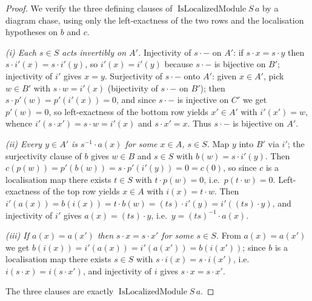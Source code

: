 \begin{proof}
  \leanok

We verify the three defining clauses of \(\operatorname{IsLocalizedModule} S\, a\) by a diagram chase,
  using only the left-exactness of the two rows and the localisation hypotheses on \(b\) and \(c\).

  \emph{(i) Each \(s \in S\) acts invertibly on \(A'\).} Injectivity of \(s \cdot -\) on \(A'\): if
  \(s \cdot x = s \cdot y\) then \(s \cdot i'(x) = s \cdot i'(y)\), so \(i'(x) = i'(y)\) because
  \(s \cdot -\) is bijective on \(B'\); injectivity of
  \(i'\) gives \(x = y\). Surjectivity of \(s \cdot -\) onto \(A'\): given \(x \in A'\), pick
  \(w \in B'\) with \(s \cdot w = i'(x)\) (bijectivity of \(s \cdot -\) on \(B'\)); then
  \(s \cdot p'(w) = p'(i'(x)) = 0\), and since \(s \cdot -\) is injective on \(C'\) we get \(p'(w) = 0\),
  so left-exactness of the bottom row yields \(x' \in A'\) with \(i'(x') = w\), whence
  \(i'(s \cdot x') = s \cdot w = i'(x)\) and \(s \cdot x' = x\). Thus \(s \cdot -\) is bijective on \(A'\).

  \emph{(ii) Every \(y \in A'\) is \(s^{-1} \cdot a(x)\) for some \(x \in A\), \(s \in S\).} Map \(y\) into
  \(B'\) via \(i'\); the surjectivity clause of \(b\) gives \(w \in B\) and \(s \in S\) with
  \(b(w) = s \cdot i'(y)\). Then \(c(p(w)) = p'(b(w)) = s \cdot p'(i'(y)) = 0 = c(0)\), so since
  \(c\) is a localisation map there exists \(t \in S\) with \(t \cdot p(w) = 0\), i.e.\
  \(p(t \cdot w) = 0\). Left-exactness of the top row yields \(x \in A\) with \(i(x) = t \cdot w\). Then
  \(i'(a(x)) = b(i(x)) = t \cdot b(w) = (t s) \cdot i'(y) = i'((t s) \cdot y)\), and injectivity of \(i'\)
  gives \(a(x) = (t s) \cdot y\), i.e.\ \(y = (ts)^{-1} \cdot a(x)\).

  \emph{(iii) If \(a(x) = a(x')\) then \(s \cdot x = s \cdot x'\) for some \(s \in S\).} From
  \(a(x) = a(x')\) we get \(b(i(x)) = i'(a(x)) = i'(a(x')) = b(i(x'))\); since \(b\) is a
  localisation map there exists \(s \in S\) with \(s \cdot i(x) = s \cdot i(x')\),
  i.e.\ \(i(s \cdot x) = i(s \cdot x')\), and injectivity of \(i\) gives \(s \cdot x = s \cdot x'\).

  The three clauses are exactly \(\operatorname{IsLocalizedModule} S\, a\).
\end{proof}

